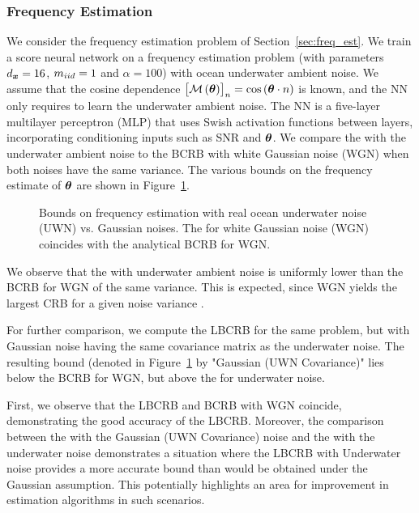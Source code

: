 \subsubsection{Frequency Estimation }
We consider the frequency estimation problem of Section~\ref{sec:freq_est}. We train a \pe{} score neural network on a frequency estimation problem (with parameters ${d_{\bm{x}}}=16$, $m_{iid}=1$ and $\alpha=100$)
with  ocean underwater ambient noise. We assume that the cosine dependence $\left[{\mathcal{M}\left(\bm{\theta}\right)}\right]_n=\cos\left({\bm{\theta}}\cdot n\right)$ is known, and the %
NN only requires to learn the underwater ambient noise. The NN
is a five-layer multilayer perceptron (MLP) that uses Swish\cite{ramachandran2017searching} activation functions between layers, incorporating conditioning inputs such as SNR and $\bm{\theta}$. We compare the \name{} with the underwater ambient noise to the BCRB with white Gaussian noise (WGN) when both noises have the same variance. The various bounds  on the {frequency estimate of $\bm{\theta}$} are shown in Figure~\ref{fig:under_weahter_freq}.


\begin{figure}
    \centering
    
    \caption{{%
    Bounds on frequency estimation with real ocean underwater noise (UWN) vs. Gaussian noises. The \name{} for white Gaussian noise (WGN) coincides with the analytical BCRB for WGN.
    }
    }
    \label{fig:under_weahter_freq}
\end{figure}



We observe that {the \name{}}
with underwater ambient noise {is uniformly lower than the BCRB for 
WGN of the same variance}. %
This is expected, since WGN yields the largest CRB for a given noise variance \cite{stoica2011gaussian}. 

%
For further comparison, 
we %
compute the LBCRB for the same problem,
but with Gaussian noise having the same covariance matrix as the underwater noise. 
{The resulting bound (denoted in Figure~\ref{fig:under_weahter_freq} by "Gaussian (UWN Covariance)" lies below the BCRB for WGN, but above the \name{} for underwater noise.}  

%
{First, we observe that the LBCRB and BCRB with WGN coincide, %
demonstrating the good accuracy of the LBCRB. }
{Moreover, } {the comparison between the \name{} with the Gaussian (UWN Covariance) noise and the \name{} with the underwater noise} demonstrates a situation where the LBCRB {with Underwater noise} 
provides a more accurate bound {than would be obtained under the Gaussian assumption.} This potentially highlights an area for improvement in estimation {algorithms in such scenarios.} 
